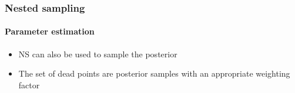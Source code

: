 \documentclass[]{beamer}
\newcommand{\lik}{\mathcal{L}}
\newcommand{\ev}{\mathcal{Z}}
\begin{document}
%
% 
%
%
%
%
%


\begin{frame}
  \frametitle{Nested sampling} 
  \framesubtitle{Parameter estimation} 

  \begin{itemize}
      \pause
    \item NS can also be used to sample the posterior
      \pause
    \item The set of dead points are posterior samples with an appropriate weighting factor
  \end{itemize}
 
\end{frame}
\end{document}
